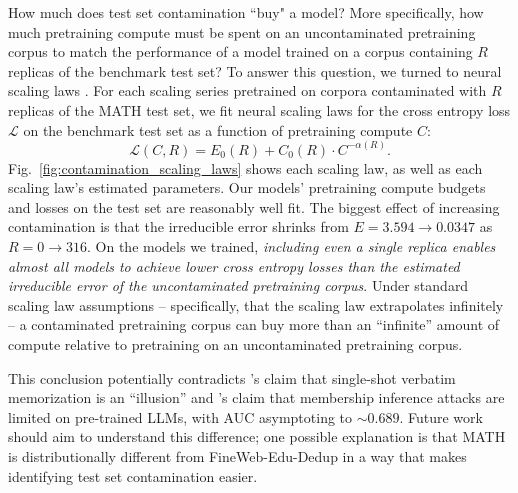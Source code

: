 How much does test set contamination ``buy" a model? 
More specifically, how much pretraining compute must be spent on an uncontaminated pretraining corpus to match the performance of a model trained on a corpus containing $R$ replicas of the benchmark test set?
To answer this question, we turned to neural scaling laws \citep{kaplan2020scaling, hoffman2022chinchilla, openai2024gpt4technicalreport, hu2024predictingemergentabilitiesinfinite, schaeffer2025pretrainingscalinglawsgenerative}. For each scaling series pretrained on corpora contaminated with $R$ replicas of the MATH test set, we fit neural scaling laws for the cross entropy loss $\mathcal{L}$ on the benchmark test set as a function of pretraining compute $C$:
%
\begin{equation}
    \label{eqn:neural_scaling_law}
    \mathcal{L}(C, R) = E_0(R) + C_0(R) \cdot C^{-\alpha(R)}.
\end{equation}
%
%
Fig.~\ref{fig:contamination_scaling_laws} shows each scaling law, as well as each scaling law's estimated parameters.
Our models' pretraining compute budgets and losses on the test set are reasonably well fit.
The biggest effect of increasing contamination is that the irreducible error shrinks from $E = 3.594 \rightarrow 0.0347$ as $R=0 \rightarrow 316$.
On the models we trained, \emph{including even a single replica enables almost all models to achieve lower cross entropy losses than the estimated irreducible error of the uncontaminated pretraining corpus}.
Under standard scaling law assumptions -- specifically, that the scaling law extrapolates infinitely -- a contaminated pretraining corpus can buy more than an ``infinite'' amount of compute relative to pretraining on an uncontaminated pretraining corpus.

This conclusion potentially contradicts \citet{huang2024demystifying}'s claim that single-shot verbatim memorization is an ``illusion''  and \citet{hayes2025exploring}'s claim that membership inference attacks are limited on pre-trained LLMs, with AUC asymptoting to $\mathord{\sim}0.689$.
Future work should aim to understand this difference; one possible explanation is that MATH is distributionally different from FineWeb-Edu-Dedup in a way that makes identifying test set contamination easier.

